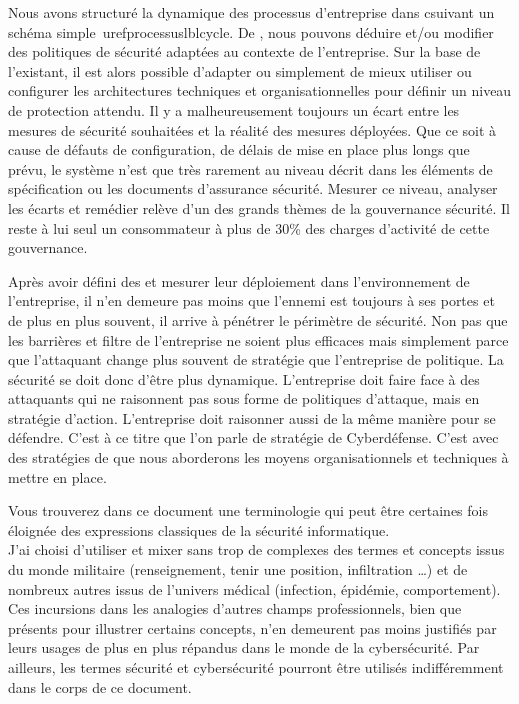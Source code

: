 Nous avons structuré la dynamique des processus d'entreprise dans c\edoc suivant un schéma simple\ uref{processus}{lblcycle}.
De  , nous pouvons déduire et/ou modifier des politiques de sécurité adaptées au contexte de l'entreprise. 
Sur la base de l’existant, il est alors possible d’adapter ou simplement de mieux utiliser ou configurer les architectures techniques et organisationnelles pour définir un niveau de protection attendu.
Il y a malheureusement toujours un écart entre les mesures de sécurité souhaitées et la réalité des mesures déployées. Que ce soit à cause de défauts de configuration, de délais de mise en place plus longs que prévu, le système n’est que très rarement au niveau décrit dans les éléments de spécification ou les documents d'assurance sécurité.
Mesurer ce niveau, analyser les écarts et remédier relève d’un des grands thèmes de la gouvernance sécurité. Il reste à lui seul un consommateur à plus de 30\% des charges d'activité de cette gouvernance.

Après avoir défini des  et mesurer leur déploiement dans l’environnement de l’entreprise, il n’en demeure pas moins que l’ennemi est toujours à ses portes et de plus en plus souvent, il arrive à pénétrer le périmètre de sécurité.
Non pas que les barrières et filtre de l'entreprise ne soient plus efficaces mais simplement parce que l'attaquant change plus souvent de stratégie que l'entreprise de politique. La sécurité se doit donc d'être plus dynamique.
L’entreprise doit faire face à des attaquants qui ne raisonnent pas sous forme de politiques d’attaque, mais en stratégie d'action. L’entreprise doit raisonner aussi de la même manière pour se défendre. C'est à ce titre que l'on parle de stratégie de Cyberdéfense.
C'est avec des stratégies de  que nous aborderons les moyens organisationnels et techniques à mettre en place.

Vous trouverez  dans ce document une terminologie qui peut être certaines fois éloignée des expressions classiques de la sécurité informatique. \\
J'ai choisi d'utiliser et mixer sans trop de complexes des termes et concepts issus du monde militaire (renseignement, tenir une position, infiltration …) et de nombreux autres issus de l'univers médical (infection, épidémie, comportement).\\ Ces incursions dans les analogies d'autres champs professionnels, bien que présents pour illustrer certains concepts, n'en demeurent pas moins justifiés par leurs usages de plus en plus répandus dans le monde de la cybersécurité. Par ailleurs, les termes sécurité et cybersécurité pourront être utilisés indifféremment dans le corps de ce document.

